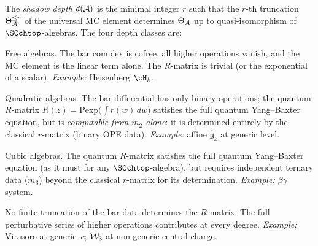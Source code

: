 \begin{proposition}
\label{prop:shadow-depth}
The \emph{shadow depth} $d(\mathcal{A})$ is the minimal integer $r$
such that the $r$-th truncation $\Theta^{\leq r}_{\mathcal{A}}$ of the
universal MC element determines $\Theta_{\mathcal{A}}$ up to
quasi-isomorphism of $\SCchtop$-algebras. The four depth
classes are:
\begin{description}[leftmargin=2em]
\item[\textbf{G} (Gaussian, $d_{\mathrm{alg}}=0$):]
 Free algebras. The bar complex is cofree, all higher
 operations vanish, and the MC element is the linear term alone.
 The $R$-matrix is trivial (or the exponential of a scalar).
 \emph{Example:} Heisenberg $\cH_k$.
\item[\textbf{L} (Lie, $d_{\mathrm{alg}}=1$):]
 Quadratic algebras. The bar differential has only binary
 operations; the quantum $R$-matrix
 $R(z) = \mathrm{Pexp}\!\bigl(\int r(w)\,dw\bigr)$
 satisfies the full quantum Yang--Baxter equation, but is
 \emph{computable from $m_2$ alone}: it is determined
 entirely by the classical $r$-matrix (binary OPE data).
 \emph{Example:} affine $\hat{\mathfrak{g}}_k$ at generic level.
\item[\textbf{C} (Contact, $d_{\mathrm{alg}}=2$):]
 Cubic algebras. The quantum $R$-matrix satisfies the full
 quantum Yang--Baxter equation (as it must for any
 $\SCchtop$-algebra), but requires independent ternary data
 ($m_3$) beyond the classical $r$-matrix for its determination.
 \emph{Example:} $\beta\gamma$ system.
\item[\textbf{M} (Mixed, $d_{\mathrm{alg}}=\infty$):]
 No finite truncation of the bar data determines the
 $R$-matrix. The full perturbative series of
 higher operations contributes at every degree.
 \emph{Example:} Virasoro at generic~$c$; $\mathcal{W}_3$ at non-generic central charge.
\end{description}
\end{proposition}

